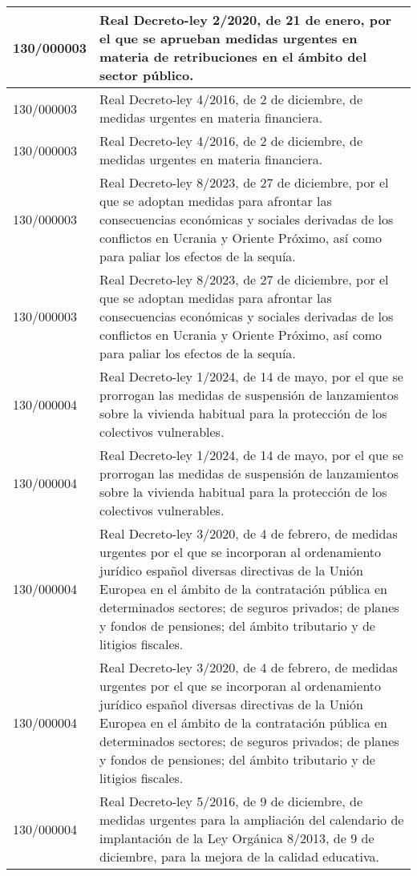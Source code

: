 {\begin{table}[H]
\begin{center}
\begin{tabularx}{\linewidth}{| l | X |}
\hline
130/000003 & Real Decreto-ley 2/2020, de 21 de enero, por el que se aprueban medidas urgentes en materia de retribuciones en el ámbito del sector público. \\
\hline
130/000003 & Real Decreto-ley 4/2016, de 2 de diciembre, de medidas urgentes en materia financiera. \\
\hline
130/000003 & Real Decreto-ley 4/2016, de 2 de diciembre, de medidas urgentes en materia financiera. \\
\hline
130/000003 & Real Decreto-ley 8/2023, de 27 de diciembre, por el que se adoptan medidas para afrontar las consecuencias económicas y sociales derivadas de los conflictos en Ucrania y Oriente Próximo, así como para paliar los efectos de la sequía. \\
\hline
130/000003 & Real Decreto-ley 8/2023, de 27 de diciembre, por el que se adoptan medidas para afrontar las consecuencias económicas y sociales derivadas de los conflictos en Ucrania y Oriente Próximo, así como para paliar los efectos de la sequía. \\
\hline
130/000004 & Real Decreto-ley 1/2024, de 14 de mayo, por el que se prorrogan las medidas de suspensión de lanzamientos sobre la vivienda habitual para la protección de los colectivos vulnerables. \\
\hline
130/000004 & Real Decreto-ley 1/2024, de 14 de mayo, por el que se prorrogan las medidas de suspensión de lanzamientos sobre la vivienda habitual para la protección de los colectivos vulnerables. \\
\hline
130/000004 & Real Decreto-ley 3/2020, de 4 de febrero, de medidas urgentes por el que se incorporan al ordenamiento jurídico español diversas directivas de la Unión Europea en el ámbito de la contratación pública en determinados sectores; de seguros privados; de planes y fondos de pensiones; del ámbito tributario y de litigios fiscales. \\
\hline
130/000004 & Real Decreto-ley 3/2020, de 4 de febrero, de medidas urgentes por el que se incorporan al ordenamiento jurídico español diversas directivas de la Unión Europea en el ámbito de la contratación pública en determinados sectores; de seguros privados; de planes y fondos de pensiones; del ámbito tributario y de litigios fiscales. \\
\hline
130/000004 & Real Decreto-ley 5/2016, de 9 de diciembre, de medidas urgentes para la ampliación del calendario de implantación de la Ley Orgánica 8/2013, de 9 de diciembre, para la mejora de la calidad educativa. \\

\end{tabularx}
\end{center}
\end{table}}
